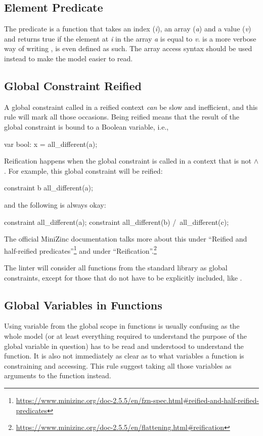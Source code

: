 \documentclass[a4paper,12pt]{article}
\begin{document}
\subsection{Element Predicate}\label{sec:rule:element}
The predicate  is a function that takes an index (\emph{i}), an array
(\emph{a}) and a value (\emph{v}) and returns true if the element at \emph{i} in the array
\emph{a} is equal to \emph{v}.  is a more verbose way of writing
,  is even defined as such. The array
access syntax should be used instead to make the model easier to read.

\subsection{Global Constraint Reified}\label{sec:rule:reifiedglobal}
A global constraint called in a reified context \emph{can} be slow and inefficient,
and this rule will mark all those occasions. Being reified means that the result of the global
constraint is bound to a Boolean variable, i.e.,
\begin{mznnobreak}
var bool: x = all_different(a);
\end{mznnobreak}
Reification happens when the global constraint is called in a context that is not $\land$.
For example, this global constraint will be reified:
\begin{mznnobreak}
constraint b \/ all_different(a);
\end{mznnobreak}
and the following is always okay:
\begin{mznnobreak}
constraint all_different(a);
constraint all_different(b) /\ all_different(c);
\end{mznnobreak}
The official MiniZinc documentation talks more about this under ``Reified and half-reified
predicates''\footnote{\url{https://www.minizinc.org/doc-2.5.5/en/fzn-spec.html\#reified-and-half-reified-predicates}}
and under ``Reification''.\footnote{\url{https://www.minizinc.org/doc-2.5.5/en/flattening.html\#reification}}

The linter will consider all functions from the standard library as global constraints,
except for those that do not have to be explicitly included, like .

\subsection{Global Variables in Functions}\label{sec:rule:globalfun}
Using variable from the global scope in functions is usually confusing as the whole model
(or at least everything required to understand the purpose of the global variable in
question) has to be read and understood to understand the function. It is also not
immediately as clear as to what variables a function is constraining and accessing. This rule
suggest taking all those variables as arguments to the function instead.
\end{document}
